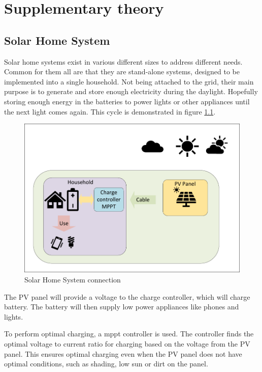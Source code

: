 
\chapter{Supplementary theory}
\label{ch:theory}

\section{Solar Home System}
Solar home systems exist in various different sizes to address different needs. Common for them all are that they are stand-alone systems, designed to be implemented into a single household. Not being attached to the grid, their main purpose is to generate and store enough electricity during the daylight. Hopefully storing enough energy in the batteries to power lights or other appliances until the next light comes again. This cycle is demonstrated in figure \ref{fig:SHS_drawing}.

\begin{figure}[h]
    \centering
    \includegraphics[width=\linewidth]{photos/SHS_drawing.pdf}
    \caption{Solar Home System connection}
    \label{fig:SHS_drawing}
\end{figure}

The PV panel will provide a voltage to the charge controller, which will charge battery. The battery will then supply low power appliances like phones and lights. 

To perform optimal charging, a \acrfull{mppt} controller is used. The controller finds the optimal voltage to current ratio for charging based on the voltage from the PV panel. This ensures optimal charging even when the PV panel does not have optimal conditions, such as shading, low sun or dirt on the panel.

